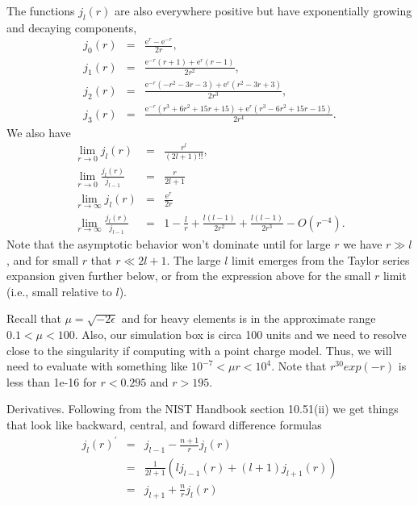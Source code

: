 \documentclass[12pt]{article}
\begin{document}
The functions $j_l(r)$ are also everywhere positive but have exponentially growing and decaying components,
\begin{eqnarray}
  j_0(r) & = & \frac{{\mathrm e}^{r}-{\mathrm e}^{-r}}{2 r} , \label{eqn:j0} \\
  j_1(r) & = & \frac{{\mathrm e}^{-r}\left(r +1\right) +{\mathrm e}^{r} \left(r -1\right)}{2 r^{2}} , \\
  j_2(r) & = & \frac{{\mathrm e}^{-r}\left(-r^{2}-3 r -3\right)+{\mathrm e}^{r} \left(r^{2}-3 r +3\right)}{2 r^{3}} , \\
  j_3(r) & = & \frac{{\mathrm e}^{-r}\left(r^{3}+6 r^{2}+15 r +15\right)+{\mathrm e}^{r} \left(r^{3}-6 r^{2}+15 r -15\right)}{2 r^{4}} .
\end{eqnarray}
We also have
\begin{eqnarray} 
  \lim_{r \rightarrow 0} j_l(r) & = & \frac{r^l}{(2l+1)!!} , \label{eqn:jsmallr}\\
  \lim_{r \rightarrow 0} \frac{j_l(r)}{j_{l-1}} & = & \frac{r}{2l+1} \\
  \lim_{r \rightarrow \infty} j_l(r) & = & \frac{{\mathrm e}^{r}}{2r} \\
  \lim_{r \rightarrow \infty} \frac{j_l(r)}{j_{l-1}} & = & 1 - \frac{l}{r} + \frac{l(l-1)}{2 r^2} + \frac{l(l-1)}{2 r^3} - O(r^{-4}) .
\end{eqnarray}
Note that the asymptotic behavior won't dominate until for large $r$ we have $r \gg l$, and for small $r$ that $r \ll 2l+1$.  The large $l$ limit emerges from the Taylor series expansion given further below, or from the expression above for the small $r$ limit (i.e., small relative to $l$).

Recall that $\mu = \sqrt{-2 \epsilon}$ and for heavy elements is in the approximate range $0.1<\mu<100$.  Also, our simulation box is circa 100 units and we need to resolve close to the singularity if computing with a point charge model.  Thus, we will need to evaluate with something like $10^{-7} < \mu r < 10^4$.  Note that $r^{30}exp(-r)$ is less than 1e-16 for $r<0.295$ and $r>195$.

Derivatives.  Following from the NIST Handbook section 10.51(ii) we get things that look like backward, central, and foward difference formulas
\begin{eqnarray}
  j_l(r)^\prime & = & j_{l-1} - \frac{n+1}{r} j_l(r) \\
              & = & \frac{1}{2l+1} \left( l j_{l-1}(r) + (l+1) j_{l+1}(r)  \right) \\
              & = &  j_{l+1} + \frac{n}{r} j_l(r)
\end{eqnarray}
\end{document}
